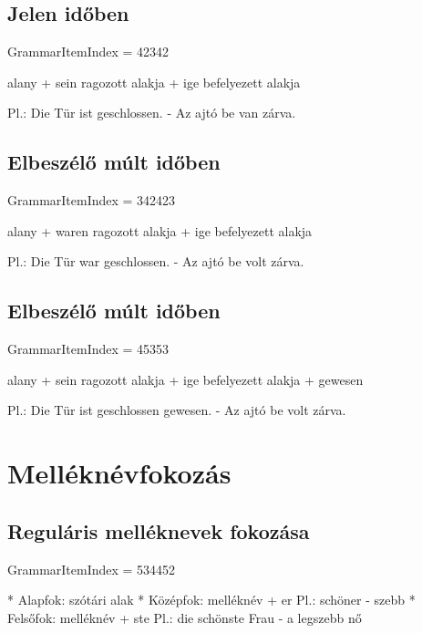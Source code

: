\documentclass{article}
\newenvironment{desc}{\verbatim}{\endverbatim}
\begin{document}
\subsection{Jelen időben}

GrammarItemIndex = 42342

\begin{desc}
alany + sein ragozott alakja + ige befelyezett alakja

Pl.: Die Tür ist geschlossen. - Az ajtó be van zárva.
\end{desc}

\subsection{Elbeszélő múlt időben}

GrammarItemIndex = 342423

\begin{desc}
alany + waren ragozott alakja + ige befelyezett alakja

Pl.: Die Tür war geschlossen. - Az ajtó be volt zárva.
\end{desc}

\subsection{Elbeszélő múlt időben}

GrammarItemIndex = 45353

\begin{desc}
alany + sein ragozott alakja + ige befelyezett alakja + gewesen

Pl.: Die Tür ist geschlossen gewesen. - Az ajtó be volt zárva.
\end{desc}

\section{Melléknévfokozás}

\subsection{Reguláris melléknevek fokozása}

GrammarItemIndex = 534452

\begin{desc}
* Alapfok: szótári alak
* Középfok: melléknév + er
  Pl.: schöner - szebb
* Felsőfok: melléknév + ste
  Pl.: die schönste Frau - a legszebb nő
\end{desc}
\end{document}
